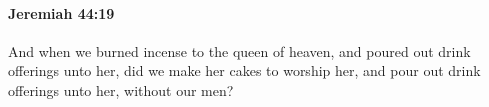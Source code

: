
		\paragraph{Jeremiah 44:19} %
			\label{JEREMIAH-44-19}

			And when we burned incense to the queen of heaven, and poured out drink offerings unto her, did we make her cakes to worship her, and pour out drink offerings unto her, without our men?


